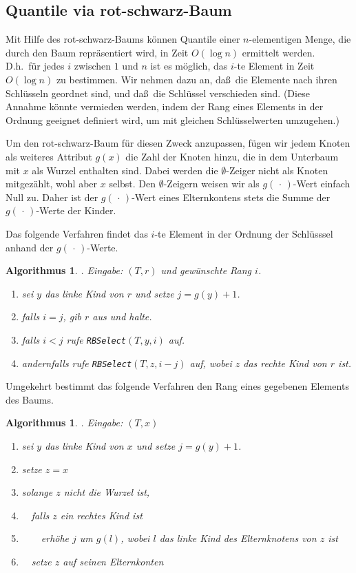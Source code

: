 \documentclass[10pt,reqno]{amsart}
\numberwithin{equation}{section}
\newcommand\nix{\,\cdot\,}
\newtheorem{algorithm}[definition]{Algorithmus}
\begin{document}
\subsection{Quantile via rot-schwarz-Baum}\label{sec_rbquant}
Mit Hilfe des rot-schwarz-Baums k\"onnen Quantile einer $n$-ele\-mentigen Menge, die durch den Baum repr\"asentiert wird, in Zeit $O(\log n)$ ermittelt werden.
D.h.\ f\"ur jedes $i$ zwischen $1$ und $n$ ist es m\"oglich, das $i$-te Element in Zeit $O(\log n)$ zu bestimmen.
Wir nehmen dazu an, da\ss\ die Elemente nach ihren Schl\"usseln geordnet sind, und da\ss\ die Schl\"ussel verschieden sind.
(Diese Annahme k\"onnte vermieden werden, indem der Rang eines Elements in der Ordnung geeignet definiert wird, um mit gleichen Schl\"usselwerten umzugehen.)

Um den rot-schwarz-Baum f\"ur diesen Zweck anzupassen, f\"ugen wir jedem Knoten als weiteres Attribut $g(x)$ die Zahl der Knoten hinzu, die in dem Unterbaum mit $x$ als Wurzel enthalten sind.
Dabei werden die $\emptyset$-Zeiger nicht als Knoten mitgez\"ahlt, wohl aber $x$ selbst.
Den $\emptyset$-Zeigern weisen wir als $g(\nix)$-Wert einfach Null zu.
Daher ist der $g(\nix)$-Wert eines Elternkontens stets die Summe der $g(\nix)$-Werte der Kinder.

Das folgende Verfahren findet das $i$-te Element in der Ordnung der Schl\"usssel anhand der $g(\nix)$-Werte.

\begin{algorithm}. {\em Eingabe:} $(T,r)$ und gew\"unschte Rang $i$.
	\begin{enumerate}
		\item sei $y$ das linke Kind von $r$ und setze $j=g(y)+1$.
		\item falls $i=j$, gib $r$ aus und halte.
		\item falls $i<j$ rufe {\tt RBSelect}$(T,y,i)$ auf.
		\item andernfalls rufe {\tt RBSelect}$(T,z,i-j)$ auf, wobei $z$ das rechte Kind von $r$ ist.
	\end{enumerate}
\end{algorithm}

Umgekehrt bestimmt das folgende Verfahren den Rang eines gegebenen Elements des Baums.

\begin{algorithm}. {\em Eingabe:} $(T,x)$
	\begin{enumerate}
		\item sei $y$ das linke Kind von $x$ und setze $j=g(y)+1$.
		\item setze $z=x$
		\item solange $z$ nicht die Wurzel ist,
		\item $\quad$falls $z$ ein rechtes Kind ist
		\item $\qquad$erh\"ohe $j$ um $g(l)$, wobei $l$ das linke Kind des Elternknotens von $z$ ist
		\item $\quad$setze $z$ auf seinen Elternkonten
	\end{enumerate}
\end{algorithm}
\end{document}

